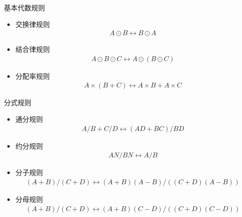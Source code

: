 \vspace{1mm}
\begin{center}
{\kaishu{} 基本代数规则}
\end{center}
\vspace{1mm}

\begin{itemize}
  \item {\kaishu 交换律规则} 
  \begin{gather*}
  A \odot B \longleftrightarrow B \odot A  
  \end{gather*}

  \item {\kaishu 结合律规则} 
  \begin{gather*}
  A \odot B \odot C \longleftrightarrow A \odot (B \odot C) 
  \end{gather*}

  \item {\kaishu 分配率规则} 
  \begin{gather*}
  A \times (B + C) \longleftrightarrow A \times B + A \times C 
  \end{gather*}
\end{itemize}

\vspace{1mm}
\begin{center}
{\kaishu{} 分式规则}
\end{center}
\vspace{1mm}

\begin{itemize}
  \item {\kaishu 通分规则} 
  \begin{gather*}
  A / B + C / D \longleftrightarrow (AD+BC) / BD 
  \end{gather*}

  \item {\kaishu 约分规则} 
  \begin{gather*}
  AN / BN \longleftrightarrow A / B 
  \end{gather*}

  \item {\kaishu 分子规则} 
  \begin{gather*}
  (A+B) / (C+D) \longleftrightarrow (A+B)(A-B) / ((C+D)(A-B)) 
  \end{gather*}

  \item {\kaishu 分母规则} 
  \begin{gather*}
  (A+B) / (C+D) \longleftrightarrow (A+B)(C-D) / ((C+D)(C-D)) 
  \end{gather*}
\end{itemize}


